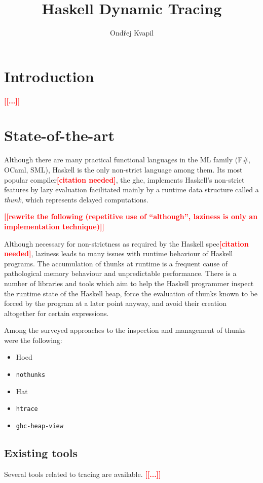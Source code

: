 \documentclass[thesis=B,english]{FITthesis}[2019/12/23]
\title{Haskell Dynamic Tracing}
\author{Ondřej Kvapil} %
\newcommand{\todo}[1]{\textcolor{red}{\textbf{[[#1]]}}}
\newcommand{\citationNeeded}{\textcolor{red}{\textbf{[citation needed]}}}
\newcommand{\hackage}[1]{\texttt{#1}}
\begin{document}
\chapter{Introduction} \label{sec:intro}
\todo{...}


\chapter{State-of-the-art} \label{sec:state-of-the-art}
Although there are many practical functional languages in the ML family (F\#,
OCaml, SML), Haskell is the only non-strict language among them. Its most
popular compiler\citationNeeded, the \acrfull{ghc}, implements Haskell's
non-strict features by lazy evaluation facilitated mainly by a runtime data
structure called a \textit{thunk}, which represents delayed computations.

\todo{rewrite the following (repetitive use of ``although'', laziness is only
an implementation technique)}

Although necessary for non-strictness as required by the Haskell
spec\citationNeeded, laziness leads to many issues with runtime behaviour of
Haskell programs. The accumulation of thunks at runtime is a frequent cause of
pathological memory behaviour and unpredictable performance. There is a number
of libraries and tools which aim to help the Haskell programmer inspect the
runtime state of the Haskell heap, force the evaluation of thunks known to be
forced by the program at a later point anyway, and avoid their creation
altogether for certain expressions.

Among the surveyed approaches to the inspection and management of thunks were
the following:
\begin{itemize}
	\item Hoed
	\item \hackage{nothunks}
	\item Hat
	\item \hackage{htrace}
	\item \hackage{ghc-heap-view}
\end{itemize}

\section{Existing tools} \label{sec:existing-tools}
Several tools related to tracing are available.
\todo{...}
\end{document}
